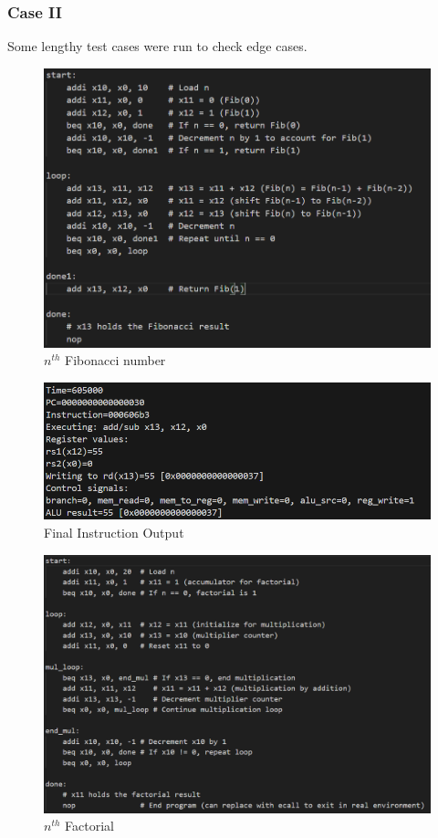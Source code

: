 \documentclass{article}
\numberwithin{figure}{section}
\numberwithin{table}{section}
\begin{document}
\subsubsection*{Case II}
Some lengthy test cases were run to check edge cases.
\begin{figure}[H]
    \centering
    \includegraphics[width=1\linewidth]{Sequential_fibonacci.png}
    \caption{$n^{th}$ Fibonacci number}
    \label{fig:fibonacci}
\end{figure}
\begin{figure}[H]
    \centering
    \includegraphics[width=1\linewidth]{Fibonacci_final_instruction.png}
    \caption{Final Instruction Output}
    \label{fig:fibonacci-output}
\end{figure}
\begin{figure}[H]
    \centering
    \includegraphics[width=1\linewidth]{sequential_factorial.png}
    \caption{$n^{th}$ Factorial}
    \label{fig:factorial}
\end{figure}
\end{document}
